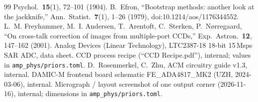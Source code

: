 \documentclass[10pt,a4paper]{article}
\newcommand{\code}[1]{\texttt{\small #1}}
\begin{document}
\begin{thebibliography}{99}
Psychol.\ \textbf{15}(1), 72--101 (1904).
 B.~Efron, ``Bootstrap methods: another look at the jackknife,'' Ann.\ Statist.\ \textbf{7}(1), 1--26
(1979), doi:10.1214/aos/1176344552.
 L.~M. Freyhammer, M.~I. Andersen, T.~Arentoft, C.~Sterken, P.~N\o rregaard, ``On cross-talk
correction of images from multiple-port CCDs,'' Exp.\ Astron.\ \textbf{12}, 147--162 (2001).
 Analog Devices (Linear Technology), LTC2387-18 18-bit 15\,Msps SAR ADC, data sheet.
 CCD process recipe (``CCD Recipe.pdf''), internal; values in \code{amp\_phys/priors.toml}.
 D.~Rosenmerkel, C.~Zhu, ACM circuitry guide v1.3, internal.
 DAMIC-M frontend board schematic FE\_ADA4817\_MK2 (UZH, 2024-03-06), internal.
 Micrograph / layout screenshot of one output corner (2026-11-16), internal; dimensions in
\code{amp\_phys/priors.toml}.
\end{thebibliography}
\end{document}
